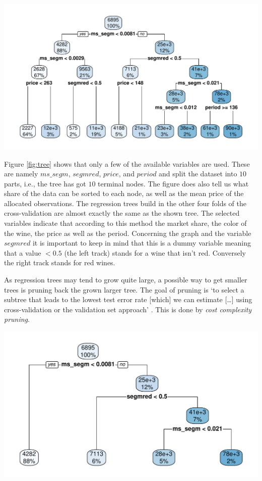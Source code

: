 \documentclass[11pt,]{article}
\let\origfigure\figure
\let\endorigfigure\endfigure
\renewenvironment{figure}[1][2] {
    \expandafter\origfigure\expandafter[H]
} {
    \endorigfigure
}
\begin{document}
\begin{figure}
\centering
\includegraphics{../00_data/output_paper/09_tree.pdf}
\caption{\label{fig:tree}Example of a Regression Tree.}
\end{figure}

Figure \ref{fig:tree} shows that only a few of the available variables
are used. These are namely \(ms\_segm\), \(segmred\), \(price\), and
\(period\) and split the dataset into \(10\) parts, i.e., the tree has
got \(10\) terminal nodes. The figure does also tell us what share of
the data can be sorted to each node, as well as the mean price of the
allocated observations. The regression trees build in the other four
folds of the cross-validation are almost exactly the same as the shown
tree. The selected variables indicate that according to this method the
market share, the color of the wine, the price as well as the period.
Concerning the graph and the variable \(segmred\) it is important to
keep in mind that this is a dummy variable meaning that a value
\(< 0.5\) (the left track) stands for a wine that isn't red. Conversely
the right track stands for red wines.

As regression trees may tend to grow quite large, a possible way to get
smaller trees is pruning back the grown larger tree. The goal of pruning
is `to select a subtree that leads to the lowest test error rate
{[}which{]} we can estimate {[}\ldots{]} using cross-validation or the
validation set approach' \autocite[][p. 308]{James2014}. This is done by
\emph{cost complexity pruning}.

\begin{figure}
\centering
\includegraphics{../00_data/output_paper/09_tree_pruned.pdf}
\caption{\label{fig:tree_pruned}Example of a Pruned Tree.}
\end{figure}
\end{document}
